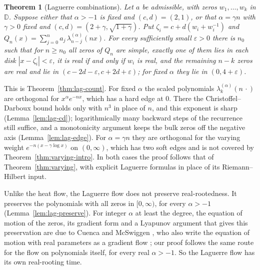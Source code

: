\documentclass[11pt]{amsart}
\newtheorem{theorem}{Theorem}[section]
\theoremstyle{definition}
\theoremstyle{remark}
\numberwithin{equation}{section}
\newcommand{\D}{\mathbb{D}}
\newcommand{\eps}{\varepsilon}
\begin{document}
\begin{theorem}[Laguerre combinations]\label{thm:lag-count-intro}
Let $a$ be admissible, with zeros $w_1,\dots,w_k$ in $\D$. Suppose either that $\alpha>-1$ is fixed and $(c,d)=(2,1)$, or that $\alpha=\gamma n$ with $\gamma>0$ fixed and $(c,d)=(2+\gamma,\sqrt{1+\gamma})$. Put $\zeta_i=c+d(w_i+w_i^{-1})$ and $Q_n(x)=\sum_{j=0}^{n}a_j\,\lambda^{(\alpha)}_{n-j}(nx)$. For every sufficiently small $\eps>0$ there is $n_0$ such that for $n\ge n_0$ all zeros of $Q_n$ are simple, exactly one of them lies in each disk $|x-\zeta_i|<\eps$, it is real if and only if $w_i$ is real, and the remaining $n-k$ zeros are real and lie in $(c-2d-\eps,c+2d+\eps)$; for fixed $\alpha$ they lie in $(0,4+\eps)$.
\end{theorem}

This is Theorem~\ref{thm:lag-count}. For fixed $\alpha$ the scaled polynomials $\lambda^{(\alpha)}_k(n\,\cdot)$ are orthogonal for $x^\alpha e^{-nx}$, which has a hard edge at $0$. There the Christoffel--Darboux bound \cite[Lemma~\ref{M-lem:cd}]{Main} holds only with $n^3$ in place of $n$, and this exponent is sharp (Lemma~\ref{lem:lag-cd}); logarithmically many backward steps of the recurrence still suffice, and a monotonicity argument keeps the bulk zeros off the negative axis (Lemma~\ref{lem:lag-edge}). For $\alpha=\gamma n$ they are orthogonal for the varying weight $e^{-n(x-\gamma\log x)}$ on $(0,\infty)$, which has two soft edges and is not covered by Theorem~\ref{thm:varying-intro}. In both cases the proof follows that of Theorem~\ref{thm:varying}, with explicit Laguerre formulas in place of its Riemann--Hilbert input.

Unlike the heat flow, the Laguerre flow does not preserve real-rootedness. It preserves the polynomials with all zeros in $[0,\infty)$, for every $\alpha>-1$ (Lemma~\ref{lem:lag-preserve}). For integer $\alpha$ at least the degree, the equation of motion of the zeros, its gradient form and a Lyapunov argument that gives this preservation are due to Cuenca and McSwiggen \cite{CM}, who also write the equation of motion with real parameters as a gradient flow \cite[Section~5.1]{CM}; our proof follows the same route for the flow on polynomials itself, for every real $\alpha>-1$. So the Laguerre flow has its own real-rooting time.
\end{document}
